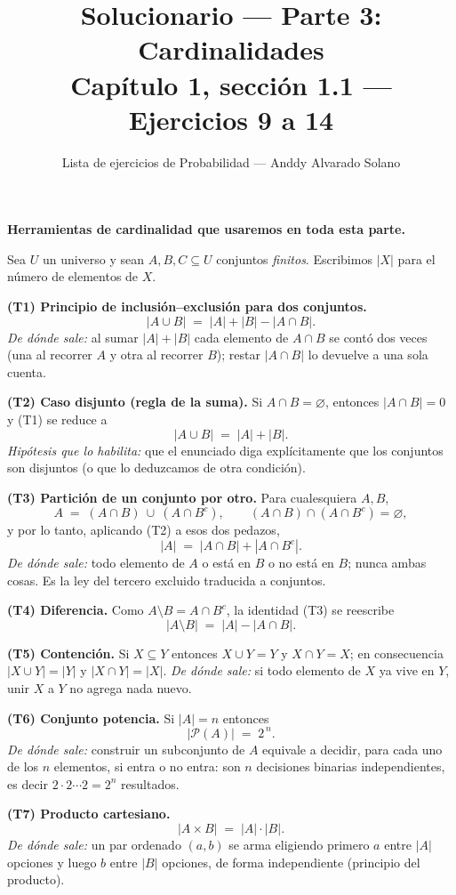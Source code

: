 \documentclass[11pt]{article}
\title{Solucionario --- Parte 3: Cardinalidades\\ \large Capítulo 1, sección 1.1 --- Ejercicios 9 a 14}
\author{Lista de ejercicios de Probabilidad --- Anddy Alvarado Solano}
\date{}
\begin{document}
\maketitle

\begin{teo}
\textbf{Herramientas de cardinalidad que usaremos en toda esta parte.}

Sea $U$ un universo y sean $A,B,C\subseteq U$ conjuntos \emph{finitos}. Escribimos $|X|$ para el número de elementos de $X$.

\medskip
\textbf{(T1) Principio de inclusión--exclusión para dos conjuntos.}
\[
|A\cup B| \;=\; |A| + |B| - |A\cap B|.
\]
\emph{De dónde sale:} al sumar $|A|+|B|$ cada elemento de $A\cap B$ se contó dos veces (una al recorrer $A$ y otra al recorrer $B$); restar $|A\cap B|$ lo devuelve a una sola cuenta.

\medskip
\textbf{(T2) Caso disjunto (regla de la suma).} Si $A\cap B=\varnothing$, entonces $|A\cap B|=0$ y (T1) se reduce a
\[
|A\cup B| \;=\; |A| + |B|.
\]
\emph{Hipótesis que lo habilita:} que el enunciado diga explícitamente que los conjuntos son disjuntos (o que lo deduzcamos de otra condición).

\medskip
\textbf{(T3) Partición de un conjunto por otro.} Para cualesquiera $A,B$,
\[
A \;=\; (A\cap B)\ \cup\ (A\cap B^{c}),
\qquad (A\cap B)\cap(A\cap B^{c})=\varnothing,
\]
y por lo tanto, aplicando (T2) a esos dos pedazos,
\[
|A| \;=\; |A\cap B| + |A\cap B^{c}|.
\]
\emph{De dónde sale:} todo elemento de $A$ o está en $B$ o no está en $B$; nunca ambas cosas. Es la ley del tercero excluido traducida a conjuntos.

\medskip
\textbf{(T4) Diferencia.} Como $A\setminus B = A\cap B^{c}$, la identidad (T3) se reescribe
\[
|A\setminus B| \;=\; |A| - |A\cap B|.
\]

\medskip
\textbf{(T5) Contención.} Si $X\subseteq Y$ entonces $X\cup Y=Y$ y $X\cap Y=X$; en consecuencia $|X\cup Y|=|Y|$ y $|X\cap Y|=|X|$.
\emph{De dónde sale:} si todo elemento de $X$ ya vive en $Y$, unir $X$ a $Y$ no agrega nada nuevo.

\medskip
\textbf{(T6) Conjunto potencia.} Si $|A|=n$ entonces
\[
|\mathcal{P}(A)| \;=\; 2^{\,n}.
\]
\emph{De dónde sale:} construir un subconjunto de $A$ equivale a decidir, para cada uno de los $n$ elementos, si entra o no entra: son $n$ decisiones binarias independientes, es decir $2\cdot 2\cdots 2 = 2^{n}$ resultados.

\medskip
\textbf{(T7) Producto cartesiano.}
\[
|A\times B| \;=\; |A|\cdot|B|.
\]
\emph{De dónde sale:} un par ordenado $(a,b)$ se arma eligiendo primero $a$ entre $|A|$ opciones y luego $b$ entre $|B|$ opciones, de forma independiente (principio del producto).


\end{teo}
\end{document}
